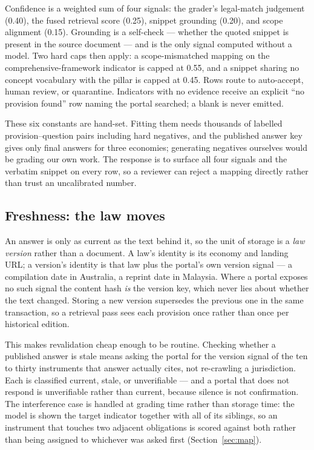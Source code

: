 \documentclass{article}
\begin{document}
Confidence is a weighted sum of four signals: the grader's legal-match judgement
(0.40), the fused retrieval score (0.25), snippet grounding (0.20), and scope
alignment (0.15). Grounding is a self-check --- whether the quoted snippet is
present in the source document --- and is the only signal computed without a
model. Two hard caps then apply: a scope-mismatched mapping on the
comprehensive-framework indicator is capped at 0.55, and a snippet sharing no
concept vocabulary with the pillar is capped at 0.45. Rows route to auto-accept,
human review, or quarantine. Indicators with no evidence receive an explicit
``no provision found'' row naming the portal searched; a blank is never emitted.

These six constants are hand-set. Fitting them needs thousands of labelled
provision--question pairs including hard negatives, and the published answer key
gives only final answers for three economies; generating negatives ourselves
would be grading our own work. The response is to surface all four signals and
the verbatim snippet on every row, so a reviewer can reject a mapping directly
rather than trust an uncalibrated number.

\subsection{Freshness: the law moves}
\label{sec:freshness}

An answer is only as current as the text behind it, so the unit of storage is a
\emph{law version} rather than a document. A law's identity is its economy and
landing URL; a version's identity is that law plus the portal's own version
signal --- a compilation date in Australia, a reprint date in Malaysia. Where a
portal exposes no such signal the content hash \emph{is} the version key, which
never lies about whether the text changed. Storing a new version supersedes the
previous one in the same transaction, so a retrieval pass sees each provision
once rather than once per historical edition.

This makes revalidation cheap enough to be routine. Checking whether a published
answer is stale means asking the portal for the version signal of the ten to
thirty instruments that answer actually cites, not re-crawling a jurisdiction.
Each is classified current, stale, or unverifiable --- and a portal that does not
respond is unverifiable rather than current, because silence is not confirmation.
The interference case is handled at grading time rather than storage time: the
model is shown the target indicator together with all of its siblings, so an
instrument that touches two adjacent obligations is scored against both rather
than being assigned to whichever was asked first (Section~\ref{sec:map}).
\end{document}
